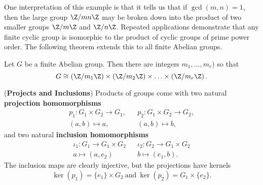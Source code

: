 \documentclass[math1530-lecture-notes]{subfiles}
\begin{document}
One interpretation of this example is that it tells us that if $\gcd{(m,n)}=1$, then the large group
$\Z / mn\Z$ may be broken down into the product of two smaller groups $\Z / m\Z$ and $\Z / n\Z$.
Repeated applications demonstrate that any finite cyclic group is isomorphic to the product of
cyclic groups of prime power order. The following theorem extends this to all finite Abelian groups.
\begin{theorem}{}
  Let $G$ be a finite Abelian group. Then there are integers $ m_1,\ldots,m_r)$ so that \[
    G \cong \left( \Z / m_1\Z \right) \times \left( \Z / m_2\Z \right) \times \ldots \times \left( \Z / m_r\Z \right) 
  .\] 
\end{theorem}


\begin{example}
  (\textbf{Projects and Inclusions}) Products of groups come with two natural \textbf{projection
  homomorphisms}
  \begin{align*}
    p_1: G_1\times G_2\longrightarrow G_1, && p_2: G_1\times G_2\longrightarrow G_2,\\
    (a,b)\longmapsto a, && (a,b)\longmapsto b
  ,\end{align*} and two natural \textbf{inclusion homomorphisms}
  \begin{align*}
    \iota_1: G_1\longrightarrow G_1\times G_2 && \iota_2: G_2 \longrightarrow G_1\times G_2\\
    a\longmapsto (a,e_2) && b\longmapsto(e_1,b)
  .\end{align*}
  The inclusion maps are clearly injective, but the projections have kernels \[
    \ker(p_1) = \{ e_1 \}\times G_2 ~\text{and}~ \ker(p_2) = G_1 \times \{ e_2 \}
  .\] 
\end{example}
\end{document}
